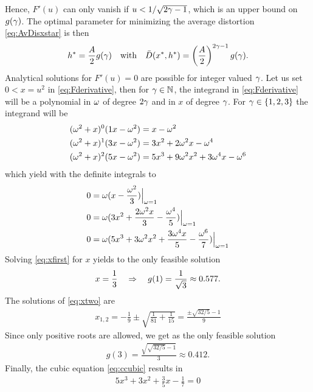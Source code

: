 \documentclass[12pt,onecolumn,journal,draftclsnofoot,letterpaper]{IEEEtran}
\newcommand{\Dis}{\ensuremath{D}}                    %
\newcommand{\AvDis}{\ensuremath{\bar{\Dis}}}         %
\begin{document}
  Hence, $F'(u)$ can only vanish if $u<1/\sqrt{2\gamma-1}$, which is an upper bound on $g(\gamma)$.
  The optimal parameter for minimizing the average distortion  \eqref{eq:AvDisxstar} is then 
  \begin{align}
    h^*= \frac{A}{2} g(\gam) \quad\text{with}\quad \AvDis(x^*,h^*)= \left(\frac{A}{2}\right)^{2\gam-1} g(\gam).
  \end{align}
  Analytical solutions for $F'(u)=0$ are possible for integer valued $\gamma$.  Let us set $0<x=u^2$ in
  \eqref{eq:Fderivative}, then for $\gamma\in{\ensuremath{\mathbb N}}$, the integrand in \eqref{eq:Fderivative} will be a polynomial in $\omega$
  of degree $2\gamma$ and in $x$ of degree $\gamma$. For $\gamma\in\{1,2,3\}$ the integrand will be 
%
\begin{align}
  (\omega^2+x)^0 (1x-\omega^2)&=x-\omega^2\\
  (\omega^2+x)^1 (3x-\omega^2)&=3x^2+2\omega^2x -\omega^4 \\
  (\omega^2+x)^2 (5x-\omega^2)&=5x^3 +9\omega^2 x^2 +3\omega^4 x -\omega^6
\end{align}
%
which yield with the definite integrals to
%
\begin{align}
  0 &= \omega(x-\frac{\omega^2}{3})\Big|_{\omega=1}\label{eq:xfirst}\\
  0 &= \omega( 3x^2 +\frac{2\omega^2x}{3} -\frac{\omega^4}{5}  )\Big|_{\omega=1}\label{eq:xtwo}\\ 
  0 &= \omega( 5x^3 + 3\omega^2x^2 +\frac{3\omega^4x}{5}  -\frac{\omega^6}{7}  )\Big|_{\omega=1}\label{eq:ccubic} 
\end{align}
%
Solving \eqref{eq:xfirst} for $x$  yields to the only feasible solution
%
\begin{align}
  x=\frac{1}{3} \quad\Rightarrow\quad g(1)=\frac{1}{\sqrt{3}}\approx 0.577.
\end{align}
%
The solutions of \eqref{eq:xtwo} are 
%
\begin{align}
  x_{1,2}= -\frac{1}{9} \pm \sqrt{\frac{1}{81}+\frac{1}{15}} = \frac{\pm \sqrt{32/5} -1}{9}
\end{align}
%
Since only positive roots are allowed, we get as the only feasible solution
%
\begin{align}
  g(3)=\frac{\sqrt{\sqrt{32/5}-1}}{3}\approx 0.412.
\end{align}
%
Finally, the cubic equation \eqref{eq:ccubic} results in
%
\begin{align}
  5x^3 + 3 x^2 + \frac{3}{5} x - \frac{1}{7}=0
\end{align}
\end{document}
